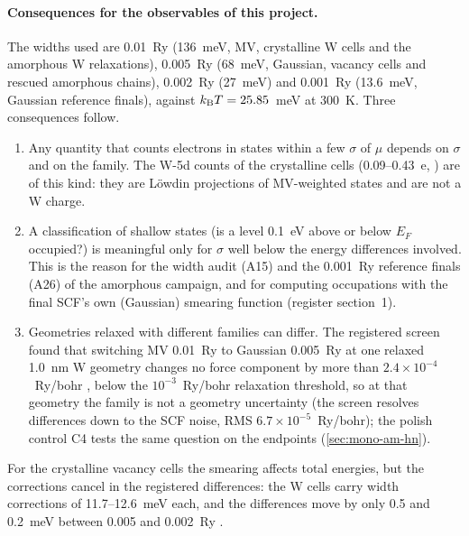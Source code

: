 \paragraph{Consequences for the observables of this project.} The widths used are 0.01~Ry (136~meV, MV, crystalline W
cells and the amorphous W relaxations), 0.005~Ry (68~meV, Gaussian, vacancy cells and rescued amorphous chains),
0.002~Ry (27~meV) and 0.001~Ry (13.6~meV, Gaussian reference finals), against $k_{\mathrm{B}}T = 25.85$~meV at 300~K. Three
consequences follow.
\begin{enumerate}
\item Any quantity that counts electrons in states within a few $\sigma$ of $\mu$ depends on $\sigma$ and on the family.
The W-5d counts of the crystalline cells (0.09--0.43~e, ) are of this kind: they are L\"owdin projections of
MV-weighted states and are not a W charge.
\item A classification of shallow states (is a level 0.1~eV above or below $E_F$ occupied?) is meaningful only for
$\sigma$ well below the energy differences involved. This is the reason for the width audit (A15) and the 0.001~Ry
reference finals (A26) of the amorphous campaign, and for computing occupations with the final SCF's own (Gaussian)
smearing function (register section~1).
\item Geometries relaxed with different families can differ. The registered screen found that switching MV 0.01~Ry to
Gaussian 0.005~Ry at one relaxed 1.0~nm W geometry changes no force component by more than $2.4\times10^{-4}$~Ry/bohr
, below the $10^{-3}$~Ry/bohr relaxation threshold, so at that geometry the family is not a geometry
uncertainty (the screen resolves differences down to the SCF noise, RMS $6.7\times10^{-5}$~Ry/bohr); the polish control C4 tests the same question on the endpoints (\cref{sec:mono-am-hn}).
\end{enumerate}

For the crystalline vacancy cells the smearing affects total energies, but the corrections cancel in the registered
differences: the W cells carry width corrections of 11.7--12.6~meV each, and the differences move by only 0.5 and
0.2~meV between 0.005 and 0.002~Ry .


